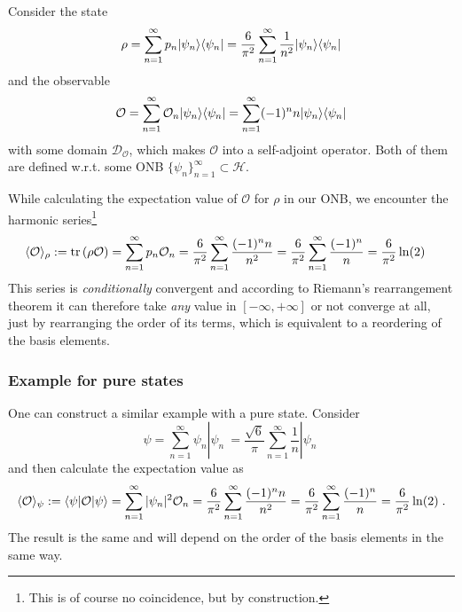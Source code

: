Consider the state
\begin{equation}
	\rho = \sum_{n=1}^{\infty} p_{n} | \psi_{n} \rangle \langle \psi_{n} | = \frac{ 6 }{ \pi^{2} } \sum_{n=1}^{\infty} \frac{ 1 }{ n^{2} } | \psi_{n} \rangle \langle \psi_{n} |
\end{equation}
and the observable
\begin{equation}
	\mathcal{O} = \sum_{n=1}^{\infty} \mathcal{O}_{n} | \psi_{n} \rangle \langle \psi_{n} | = \sum_{n=1}^{\infty} (-1)^{n} n | \psi_{n} \rangle \langle \psi_{n} |
\end{equation}
with some domain $\mathcal{D}_{\mathcal{O}}$, which makes $\mathcal{O}$ into a self-adjoint operator. Both of them are defined w.r.t. some ONB $\{ \psi_{n} \}_{n=1}^{\infty} \subset \mathcal{H}$.

While calculating the expectation value of $\mathcal{O}$ for $\rho$ in our ONB, we encounter the harmonic series\footnote{This is of course no coincidence, but by construction.}
\begin{equation}
	\begin{split}
		\langle \mathcal{O} \rangle_{\rho} := \operatorname{tr} \left( \rho \mathcal{O} \right) &= \sum_{n=1}^{\infty} p_{n} \mathcal{O}_{n} = \frac{ 6 }{ \pi^{2} } \sum_{n=1}^{\infty} \frac{ (-1)^{n} n }{ n^{2} } = \frac{ 6 }{ \pi^{2} } \sum_{n=1}^{\infty} \frac{ (-1)^{n} }{ n } = \frac{ 6 }{ \pi^{2} } \ln ( 2 )
	\end{split}
\end{equation}
This series is \emph{conditionally} convergent and according to Riemann's rearrangement theorem it can therefore take \emph{any} value in $[-\infty, +\infty]$ or not converge at all, just by rearranging the order of its terms, which is equivalent to a reordering of the basis elements.

\subsubsection{Example for pure states}
One can construct a similar example with a pure state. Consider
\begin{equation}
	\psi = \sum_{n=1}^{\infty} \psi_{n} | \psi_{n} \> = \frac{ \sqrt{6} }{ \pi } \sum_{n=1}^{\infty} \frac{ 1 }{ n } | \psi_{n} \>
\end{equation}
and then calculate the expectation value as
\begin{equation}
	\begin{split}
		\langle \mathcal{O} \rangle_{\psi} := \langle \psi | \mathcal{O} | \psi \rangle = \sum_{n=1}^{\infty} | \psi_{n} |^{2} \mathcal{O}_{n} = \frac{ 6 }{ \pi^{2} } \sum_{n=1}^{\infty} \frac{ (-1)^{n} n }{ n^{2} } = \frac{ 6 }{ \pi^{2} } \sum_{n=1}^{\infty} \frac{ (-1)^{n} }{ n } = \frac{ 6 }{ \pi^{2} } \ln ( 2 ) \; .
	\end{split}
\end{equation}
The result is the same and will depend on the order of the basis elements in the same way.

